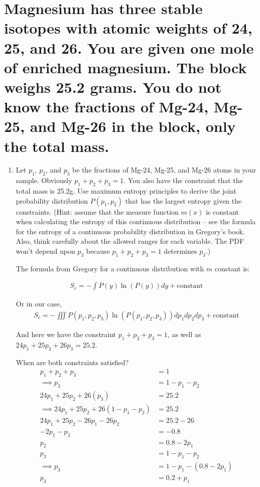 \section{Magnesium has three stable isotopes with atomic weights of 24, 25, and 26. You are given one mole of enriched magnesium. The block weighs 25.2 grams. You do not know the fractions of Mg-24, Mg-25, and Mg-26 in the block, only the total mass.}

\begin{enumerate}[label=\textbf{\Alph*}.]
    \item Let $p_1$, $p_2$, and $p_3$ be the fractions of Mg-24, Mg-25, and Mg-26 atoms in your sample. Obviously $p_1+p_2+p_3=1$. You also have the constraint that the total mass is 25.2g. Use maximum entropy principles to derive the joint probability distribution $P(p_1,p_2)$ that has the largest entropy given the constraints. (Hint: assume that the measure function $m(x)$ is constant when calculating the entropy of this continuous distribution -- see the formula for the entropy of a continuous probability distribution in Gregory's book. Also, think carefully about the allowed ranges for each variable. The PDF won't depend upon $p_3$ because $p_1+p_2+p_3=1$ determines $p_3$.)

    The formula from Gregory for a continuous distribution with $m$ constant is:

    \begin{align*}
        S_c = -\int P(y) \ln(P(y)) dy + \text{constant}
    \end{align*}

    Or in our case,
    \begin{align*}
        S_c = -\iiint P(p_1, p_2, p_3) \ln(P(p_1, p_2, p_3)) dp_1 dp_2 dp_3 + \text{constant}
    \end{align*}

    And here we have the constraint $p_1+p_2+p_3 = 1$, as well as $24p_1 + 25p_2 + 26p_3 = 25.2$.

    When are both constraints satisfied?
    \begin{align*}
        p_1 + p_2 + p_3 &= 1 \\
        \implies p_3 &= 1 - p_1 - p_2 \\
        24p_1 + 25p_2 + 26(p_3) &= 25.2\\
        \implies 24p_1 + 25p_2 + 26(1 - p_1 - p_2) &= 25.2\\
        24p_1 + 25p_2 - 26p_1 - 26p_2 &= 25.2 - 26\\
        -2p_1 - p_2 &= -0.8\\
        p_2 &= 0.8 - 2p_1\\
        p_3 &= 1 - p_1 - p_2 \\
        \implies p_3 &= 1 - p_1 - (0.8 - 2p_1) \\
        p_3 &= 0.2 + p_1 \\
    \end{align*}


\end{enumerate}
